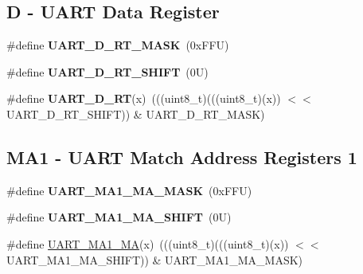 \subsection*{D -\/ U\+A\+RT Data Register}
\begin{DoxyCompactItemize}
\item 
\mbox{\label{group___u_a_r_t___register___masks_gabb8507803e62ff2f8cc3a3c7f9fc43c2}} 
\#define {\bfseries U\+A\+R\+T\+\_\+\+D\+\_\+\+R\+T\+\_\+\+M\+A\+SK}~(0x\+F\+F\+U)
\item 
\mbox{\label{group___u_a_r_t___register___masks_ga045cb82177942d68eb711a61ee412768}} 
\#define {\bfseries U\+A\+R\+T\+\_\+\+D\+\_\+\+R\+T\+\_\+\+S\+H\+I\+FT}~(0\+U)
\item 
\mbox{\label{group___u_a_r_t___register___masks_ga39c00eb3f36315de588767113f3133cd}} 
\#define {\bfseries U\+A\+R\+T\+\_\+\+D\+\_\+\+RT}(x)~(((uint8\+\_\+t)(((uint8\+\_\+t)(x)) $<$$<$ U\+A\+R\+T\+\_\+\+D\+\_\+\+R\+T\+\_\+\+S\+H\+I\+FT)) \& U\+A\+R\+T\+\_\+\+D\+\_\+\+R\+T\+\_\+\+M\+A\+SK)
\end{DoxyCompactItemize}
\subsection*{M\+A1 -\/ U\+A\+RT Match Address Registers 1}
\begin{DoxyCompactItemize}
\item 
\mbox{\label{group___u_a_r_t___register___masks_gaa4fe1e60d0ca635fd633af77c3b63998}} 
\#define {\bfseries U\+A\+R\+T\+\_\+\+M\+A1\+\_\+\+M\+A\+\_\+\+M\+A\+SK}~(0x\+F\+F\+U)
\item 
\mbox{\label{group___u_a_r_t___register___masks_ga878daa0e87ec3da2299c223b6b234976}} 
\#define {\bfseries U\+A\+R\+T\+\_\+\+M\+A1\+\_\+\+M\+A\+\_\+\+S\+H\+I\+FT}~(0\+U)
\item 
\#define \mbox{\hyperlink{group___u_a_r_t___register___masks_ga6602fd7e07866385c7cd1ad2784fe334}{U\+A\+R\+T\+\_\+\+M\+A1\+\_\+\+MA}}(x)~(((uint8\+\_\+t)(((uint8\+\_\+t)(x)) $<$$<$ U\+A\+R\+T\+\_\+\+M\+A1\+\_\+\+M\+A\+\_\+\+S\+H\+I\+FT)) \& U\+A\+R\+T\+\_\+\+M\+A1\+\_\+\+M\+A\+\_\+\+M\+A\+SK)
\end{DoxyCompactItemize}

